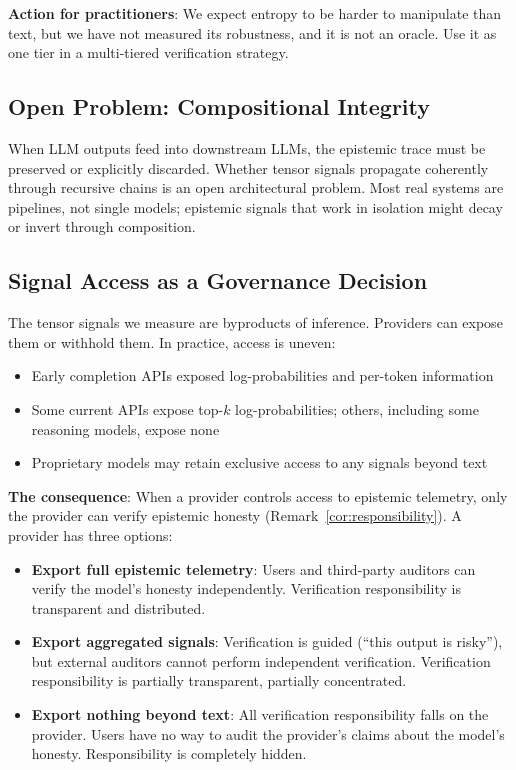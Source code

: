 \documentclass[11pt]{article}
\begin{document}
\textbf{Action for practitioners}: We expect entropy to be harder to manipulate than text, but we have not measured its robustness, and it is not an oracle. Use it as one tier in a multi-tiered verification strategy.

\subsection{Open Problem: Compositional Integrity}

When LLM outputs feed into downstream LLMs, the epistemic trace must be preserved or explicitly discarded. Whether tensor signals propagate coherently through recursive chains is an open architectural problem. Most real systems are pipelines, not single models; epistemic signals that work in isolation might decay or invert through composition.

\subsection{Signal Access as a Governance Decision}

The tensor signals we measure are byproducts of inference. Providers can expose them or withhold them. In practice, access is uneven:

\begin{itemize}
    \item Early completion APIs exposed log-probabilities and per-token information
    \item Some current APIs expose top-$k$ log-probabilities; others, including some reasoning models, expose none
    \item Proprietary models may retain exclusive access to any signals beyond text
\end{itemize}

\textbf{The consequence}: When a provider controls access to epistemic telemetry, only the provider can verify epistemic honesty (Remark~\ref{cor:responsibility}). A provider has three options:

\begin{itemize}
    \item \textbf{Export full epistemic telemetry}: Users and third-party auditors can verify the model's honesty independently. Verification responsibility is transparent and distributed.
    \item \textbf{Export aggregated signals}: Verification is guided (``this output is risky''), but external auditors cannot perform independent verification. Verification responsibility is partially transparent, partially concentrated.
    \item \textbf{Export nothing beyond text}: All verification responsibility falls on the provider. Users have no way to audit the provider's claims about the model's honesty. Responsibility is completely hidden.
\end{itemize}
\end{document}
